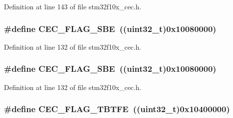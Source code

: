 Definition at line 143 of file stm32f10x\+\_\+cec.\+h.

\subsubsection[{\texorpdfstring{C\+E\+C\+\_\+\+F\+L\+A\+G\+\_\+\+S\+BE}{CEC_FLAG_SBE}}]{\setlength{\rightskip}{0pt plus 5cm}\#define C\+E\+C\+\_\+\+F\+L\+A\+G\+\_\+\+S\+BE~(({\bf uint32\+\_\+t})0x10080000)}\hypertarget{group___c_e_c__flags__definition_gac77db62c05af2462ed3f1b64cef2e136}{}\label{group___c_e_c__flags__definition_gac77db62c05af2462ed3f1b64cef2e136}


Definition at line 132 of file stm32f10x\+\_\+cec.\+h.

\subsubsection[{\texorpdfstring{C\+E\+C\+\_\+\+F\+L\+A\+G\+\_\+\+S\+BE}{CEC_FLAG_SBE}}]{\setlength{\rightskip}{0pt plus 5cm}\#define C\+E\+C\+\_\+\+F\+L\+A\+G\+\_\+\+S\+BE~(({\bf uint32\+\_\+t})0x10080000)}\hypertarget{group___c_e_c__flags__definition_gac77db62c05af2462ed3f1b64cef2e136}{}\label{group___c_e_c__flags__definition_gac77db62c05af2462ed3f1b64cef2e136}


Definition at line 132 of file stm32f10x\+\_\+cec.\+h.

\subsubsection[{\texorpdfstring{C\+E\+C\+\_\+\+F\+L\+A\+G\+\_\+\+T\+B\+T\+FE}{CEC_FLAG_TBTFE}}]{\setlength{\rightskip}{0pt plus 5cm}\#define C\+E\+C\+\_\+\+F\+L\+A\+G\+\_\+\+T\+B\+T\+FE~(({\bf uint32\+\_\+t})0x10400000)}\hypertarget{group___c_e_c__flags__definition_gaae90fd2f95085e113b6943bb35d899ba}{}\label{group___c_e_c__flags__definition_gaae90fd2f95085e113b6943bb35d899ba}


